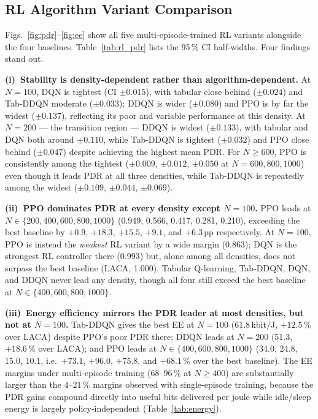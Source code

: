 \documentclass[conference]{IEEEtran}
\begin{document}
\subsection{RL Algorithm Variant Comparison}

Figs.~\ref{fig:pdr}--\ref{fig:ee} show all five multi-episode-trained RL
variants alongside the four baselines.
Table~\ref{tab:rl_pdr} lists the 95\,\% CI half-widths.
Four findings stand out.

\textbf{(i)~Stability is density-dependent rather than algorithm-dependent.}
At $N=100$, DQN is tightest (CI $\pm0.015$), with tabular close behind
($\pm0.024$) and Tab-DDQN moderate ($\pm0.033$); DDQN is wider ($\pm0.080$)
and PPO is by far the widest ($\pm0.137$), reflecting its poor and variable
performance at this density.
At $N=200$ — the transition region — DDQN is widest ($\pm0.133$), with
tabular and DQN both around $\pm0.110$, while Tab-DDQN is tightest
($\pm0.032$) and PPO close behind ($\pm0.047$) despite achieving the highest
mean PDR.
For $N\geq600$, PPO is consistently among the tightest ($\pm0.009$,
$\pm0.012$, $\pm0.050$ at $N=600,800,1000$) even though it leads PDR at all
three densities, while Tab-DDQN is repeatedly among the widest ($\pm0.109$,
$\pm0.044$, $\pm0.069$).

\textbf{(ii)~PPO dominates PDR at every density except $N=100$.}
PPO leads at $N\in\{200,400,600,800,1000\}$ (0.949, 0.566, 0.417, 0.281,
0.210), exceeding the best baseline by $+0.9$, $+18.3$, $+15.5$, $+9.1$, and
$+6.3$\,pp respectively.
At $N=100$, PPO is instead the \emph{weakest} RL variant by a wide margin
(0.863); DQN is the strongest RL controller there (0.993) but, alone among
all densities, does not surpass the best baseline (LACA, 1.000).
Tabular Q-learning, Tab-DDQN, DQN, and DDQN never lead any density, though
all four still exceed the best baseline at $N\in\{400,600,800,1000\}$.

\textbf{(iii)~Energy efficiency mirrors the PDR leader at most densities,
but not at $N=100$.}
Tab-DDQN gives the best EE at $N=100$ (61.8\,kbit/J, $+12.5\,\%$ over LACA)
despite PPO's poor PDR there; DDQN leads at $N=200$ (51.3, $+18.6\,\%$ over
LACA); and PPO leads at $N\in\{400,600,800,1000\}$ (34.0, 24.8, 15.0, 10.1,
i.e.\ $+73.1$, $+96.0$, $+75.8$, and $+68.1\,\%$ over the best baseline).
The EE margins under multi-episode training ($68$--$96\,\%$ at
$N\geq400$) are substantially larger than the $4$--$21\,\%$ margins observed
with single-episode training, because the PDR gains compound directly into
useful bits delivered per joule while idle/sleep energy is largely
policy-independent (Table~\ref{tab:energy}).
\end{document}
